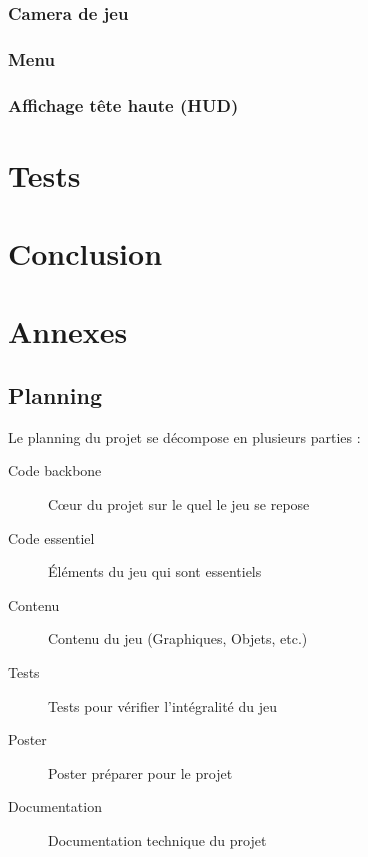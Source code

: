 \documentclass[11pt, a4paper, oneside]{report}
\begin{document}
\subsection{Camera de jeu}
\subsection{Menu}
\subsection{Affichage tête haute (HUD)}
\newpage
\chapter{Tests}

\newpage
\chapter{Conclusion}

\newpage
\chapter{Annexes}
\section{Planning}
Le planning du projet se décompose en plusieurs parties :\\
\begin{description}
	\item[Code backbone] Cœur du projet sur le quel le jeu se repose
	\item[Code essentiel] Éléments du jeu qui sont essentiels
	\item[Contenu] Contenu du jeu (Graphiques, Objets, etc.)
	\item[Tests] Tests pour vérifier l'intégralité du jeu
	\item[Poster] Poster préparer pour le projet
	\item[Documentation] Documentation technique du projet
\end{description}
\end{document}
